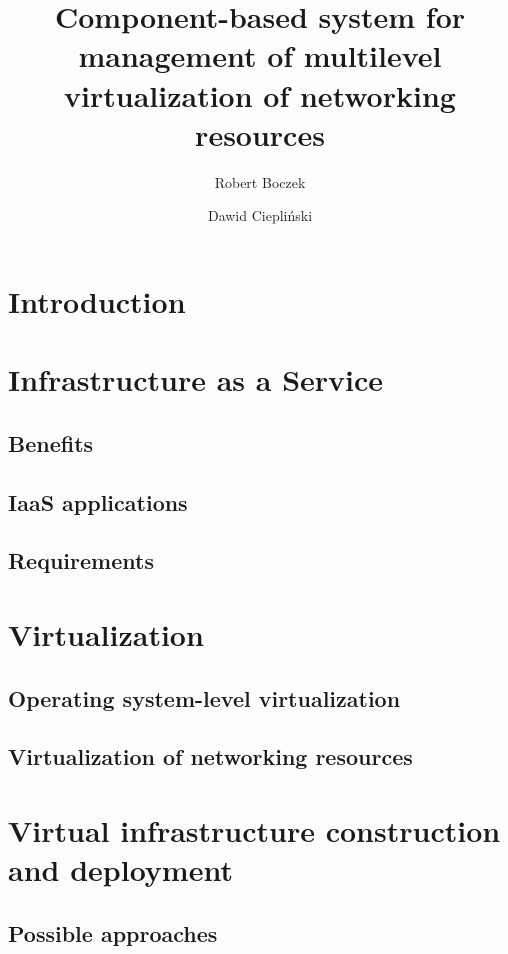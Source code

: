 \documentclass[11pt]{book}
\title{Component-based system for management of multilevel virtualization of networking resources}
\author{Robert Boczek \and Dawid Ciepliński}
\begin{document}
  \maketitle
    
  \tableofcontents
	

  \chapter{Introduction}


  \chapter{Infrastructure as a Service}

    \section{Benefits}

    \section{IaaS applications}

    \section{Requirements}


  \chapter{Virtualization}

    \section{Operating system-level virtualization}


    \section{Virtualization of networking resources}


  \chapter{Virtual infrastructure construction and deployment}

    \section{Possible approaches}
\end{document}
